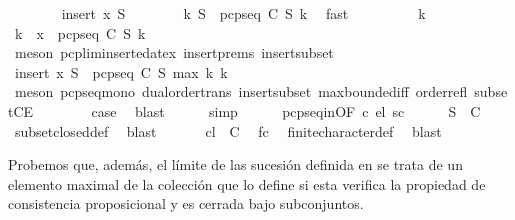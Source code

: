 \begin{isabellebody}
\ \ \ \ \ \ \isamarkupfalse%
\ {\isacharparenleft}insert\ x\ S{\isacharprime}{\isacharparenright}\isanewline
\ \ \ \ \ \ \isamarkupfalse%
\ {\isachardoublequoteopen}{\isasymexists}k{\isachardot}\ S{\isacharprime}\ {\isasymsubseteq}\ pcp{\isacharunderscore}seq\ C\ S\ k{\isachardoublequoteclose}\ \isamarkupfalse%
\ fast\isanewline
\ \ \ \ \ \ \isamarkupfalse%
\ \isamarkupfalse%
\ k{}\ \isacommand{{\isachardot}{\isachardot}}\isamarkupfalse%
\isanewline
\ \ \ \ \ \ \isamarkupfalse%
\ \isamarkupfalse%
\ k{}\ \ {\isachardoublequoteopen}x\ {\isasymin}\ pcp{\isacharunderscore}seq\ C\ S\ k{}{\isachardoublequoteclose}\isanewline
\ \ \ \ \ \ \ \ \isamarkupfalse%
\ {\isacharparenleft}meson\ pcp{\isacharunderscore}lim{\isacharunderscore}inserted{\isacharunderscore}at{\isacharunderscore}ex\ insert{\isachardot}prems\ insert{\isacharunderscore}subset{\isacharparenright}\isanewline
\ \ \ \ \ \ \isamarkupfalse%
\ \isamarkupfalse%
\ {\isachardoublequoteopen}insert\ x\ S{\isacharprime}\ {\isasymsubseteq}\ pcp{\isacharunderscore}seq\ C\ S\ {\isacharparenleft}max\ k{}\ k{}{\isacharparenright}{\isachardoublequoteclose}\isanewline
\ \ \ \ \ \ \ \ \isamarkupfalse%
\ {\isacharparenleft}meson\ pcp{\isacharunderscore}seq{\isacharunderscore}mono\ dual{\isacharunderscore}order{\isachardot}trans\ insert{\isacharunderscore}subset\ max{\isachardot}bounded{\isacharunderscore}iff\ order{\isacharunderscore}refl\ subsetCE{\isacharparenright}\isanewline
\ \ \ \ \ \ \isamarkupfalse%
\ {\isacharquery}case\ \isamarkupfalse%
\ blast\isanewline
\ \ \ \ \isamarkupfalse%
\ simp\isanewline
\ \ \ \ \isamarkupfalse%
\ pcp{\isacharunderscore}seq{\isacharunderscore}in{\isacharbrackleft}OF\ c\ el{\isacharbrackright}\ sc\isanewline
\ \ \ \ \isamarkupfalse%
\ {\isachardoublequoteopen}S{\isacharprime}\ {\isasymin}\ C{\isachardoublequoteclose}\ \isamarkupfalse%
\ subset{\isacharunderscore}closed{\isacharunderscore}def\ \isamarkupfalse%
\ blast\isanewline
\ \ \isamarkupfalse%
\isanewline
\ \ \isamarkupfalse%
\ {\isachardoublequoteopen}{\isacharquery}cl\ {\isasymin}\ C{\isachardoublequoteclose}\ \isamarkupfalse%
\ fc\ \isamarkupfalse%
\ finite{\isacharunderscore}character{\isacharunderscore}def\ \isamarkupfalse%
\ blast\isanewline
{}\isamarkupfalse%
%
\endisatagproof
{\isafoldproof}%
%
\isadelimproof
%
\endisadelimproof
%
\begin{isamarkuptext}%
Probemos que, además, el límite de las sucesión definida en  se trata de un elemento 
  maximal de la colección que lo define si esta verifica la propiedad de consistencia proposicional
  y es cerrada bajo subconjuntos.


\end{isamarkuptext}
\end{isabellebody}

